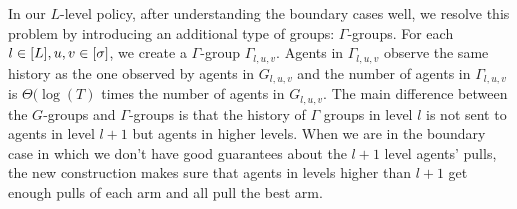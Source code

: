 In our $L$-level policy, after understanding the boundary cases well, we resolve this problem by introducing an additional type of groups: $\Gamma$-groups. For each $l \in [L], u,v \in [\sigma]$, we create a $\Gamma$-group $\Gamma_{l,u,v}$. Agents in $\Gamma_{l,u,v}$ observe the same history as the one observed by agents in $G_{l,u,v}$ and the number of agents in $\Gamma_{l,u,v}$ is $\Theta(\log(T)$ times the number of agents in $G_{l,u,v}$. The main difference between the $G$-groups and $\Gamma$-groups is that the history of $\Gamma$ groups in level $l$ is not sent to agents in level $l+1$ but agents in higher levels. When we are in the boundary case in which we don't have good guarantees about the $l+1$ level agents' pulls, the new construction makes sure that agents in levels higher than $l+1$ get enough pulls of each arm and all pull the best arm. 
